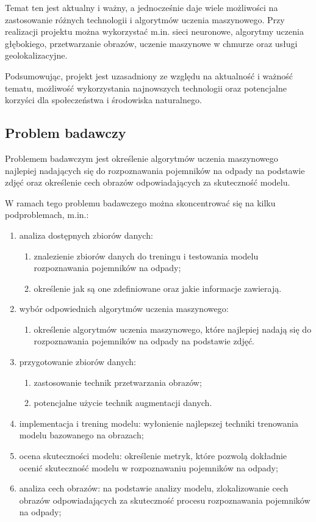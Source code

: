 \documentclass[12pt,twoside]{book}
\begin{document}
Temat ten jest aktualny i ważny, a jednocześnie daje wiele możliwości na zastosowanie różnych technologii i algorytmów uczenia maszynowego. Przy realizacji projektu można wykorzystać m.in. sieci neuronowe, algorytmy uczenia głębokiego, przetwarzanie obrazów, uczenie maszynowe w chmurze oraz usługi geolokalizacyjne.

Podsumowując, projekt \topic jest uzasadniony ze względu na aktualność i ważność tematu, możliwość wykorzystania najnowszych technologii oraz potencjalne korzyści dla społeczeństwa i środowiska naturalnego.

\subsection{Problem badawczy}

Problemem badawczym jest określenie algorytmów uczenia maszynowego najlepiej nadających się do rozpoznawania pojemników na odpady na podstawie zdjęć oraz określenie cech obrazów odpowiadających za skuteczność modelu.

W ramach tego problemu badawczego można skoncentrować się na kilku podproblemach, m.in.:
\begin{enumerate}[label=--]
    \item analiza dostępnych zbiorów danych: 
    \begin{enumerate}[label=--]
        \item znalezienie zbiorów danych do treningu i testowania modelu rozpoznawania pojemników na odpady;
        \item określenie jak są one zdefiniowane oraz jakie informacje zawierają. 
    \end{enumerate}
    \item wybór odpowiednich algorytmów uczenia maszynowego: 
    \begin{enumerate}[label=--]
        \item określenie algorytmów uczenia maszynowego, które najlepiej nadają się do rozpoznawania pojemników na odpady na podstawie zdjęć.
    \end{enumerate}
    \item przygotowanie zbiorów danych:
    \begin{enumerate}[label=--]
        \item zastosowanie technik przetwarzania obrazów;
        \item potencjalne użycie technik augmentacji danych.
    \end{enumerate}
    \item implementacja i trening modelu: wyłonienie najlepszej techniki trenowania modelu bazowanego na obrazach;
    \item ocena skuteczności modelu: określenie metryk, które pozwolą dokładnie ocenić skuteczność modelu w rozpoznawaniu pojemników na odpady;
    \item analiza cech obrazów: na podstawie analizy modelu, zlokalizowanie cech obrazów odpowiadających za skuteczność procesu rozpoznawania pojemników na odpady;
\end{enumerate}
\end{document}
